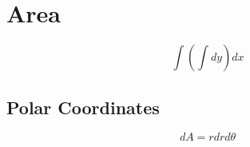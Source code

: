 \section{Area}

  \begin{equation}
    \int \left( \int dy \right) dx
  \end{equation}

  \subsection{Polar Coordinates}

    \begin{equation}
      dA = r dr d\theta
    \end{equation}
